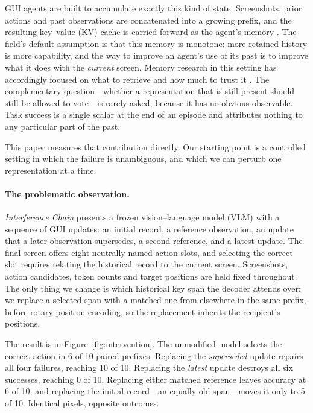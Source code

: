 \documentclass{article}
\begin{document}
GUI agents are built to accumulate exactly this kind of state. Screenshots,
prior actions and past observations are concatenated into a growing prefix, and
the resulting key--value (KV) cache is carried forward as the agent's memory
\citep{wang2024awm,liu2026memgui}. The field's default assumption is that this
memory is monotone: more retained history is more capability, and the way to
improve an agent's use of its past is to improve what it does with the
\emph{current} screen. Memory research in this setting has accordingly focused
on what to retrieve and how much to trust it \citep{wang2024awm,zhang2026focusmem}.
The complementary question---whether a representation that is still present
should still be allowed to vote---is rarely asked, because it has no obvious
observable. Task success is a single scalar at the end of an episode and
attributes nothing to any particular part of the past.

This paper measures that contribution directly. Our starting point is a
controlled setting in which the failure is unambiguous, and which we can
perturb one representation at a time.

\paragraph{The problematic observation.}
\emph{Interference Chain} presents a frozen vision--language model (VLM) with a
sequence of GUI updates: an initial record, a reference observation, an update
that a later observation supersedes, a second reference, and a latest update.
The final screen offers eight neutrally named action slots, and selecting the
correct slot requires relating the historical record to the current screen.
Screenshots, action candidates, token counts and target positions are held
fixed throughout. The only thing we change is which historical key span the
decoder attends over: we replace a selected span with a matched one from
elsewhere in the same prefix, before rotary position encoding, so the
replacement inherits the recipient's positions.

The result is in Figure~\ref{fig:intervention}. The unmodified model selects the
correct action in 6 of 10 paired prefixes. Replacing the \emph{superseded}
update repairs all four failures, reaching 10 of 10. Replacing the
\emph{latest} update destroys all six successes, reaching 0 of 10. Replacing
either matched reference leaves accuracy at 6 of 10, and replacing the initial
record---an equally old span---moves it only to 5 of 10. Identical pixels, opposite
outcomes.
\end{document}
